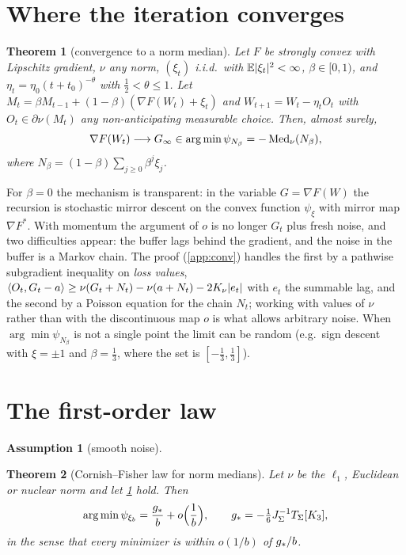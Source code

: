 \documentclass{article}
\theoremstyle{plain}
\newtheorem{theorem}{Theorem}
\theoremstyle{definition}
\newtheorem{assumption}{Assumption}
\theoremstyle{remark}
\begin{document}
\section{Where the iteration converges}\label{sec:conv}

\begin{theorem}[convergence to a norm median]\label{thm:conv}
Let $F$ be strongly convex with Lipschitz gradient, $\nu$ any norm, $(\xi_t)$ i.i.d.\ with $\mathbb{E}|\xi_t|^2<\infty$,
$\beta\in[0,1)$, and $\eta_t=\eta_0(t+t_0)^{-\theta}$ with $\frac12<\theta\le1$. Let
$M_t=\beta M_{t-1}+(1-\beta)(\nabla F(W_t)+\xi_t)$ and $W_{t+1}=W_t-\eta_tO_t$ with $O_t\in\partial\nu(M_t)$ any
non-anticipating measurable choice. Then, almost surely,
\[
\nabla F(W_t)\longrightarrow G_\infty\in\arg\min\psi_{N_\beta}=-\operatorname{Med}_\nu(N_\beta),
\]
where $N_\beta=(1-\beta)\sum_{j\ge0}\beta^j\xi_j$.
\end{theorem}

For $\beta=0$ the mechanism is transparent: in the variable $G=\nabla F(W)$ the recursion is stochastic mirror
descent on the convex function $\psi_\xi$ with mirror map $\nabla F^\ast$. With momentum the argument of $o$ is no
longer $G_t$ plus fresh noise, and two difficulties appear: the buffer lags behind the gradient, and the noise in
the buffer is a Markov chain. The proof (\cref{app:conv}) handles the first by a pathwise subgradient inequality on
\emph{loss values}, $\langle O_t, G_t-a\rangle\ge\nu(G_t+N_t)-\nu(a+N_t)-2K_\nu|e_t|$ with $e_t$ the summable lag, and the second
by a Poisson equation for the chain $N_t$; working with values of $\nu$ rather than with the discontinuous map $o$ is
what allows arbitrary noise. When $\arg\min\psi_{N_\beta}$ is not a single point the limit can be random (e.g.\ sign
descent with $\xi=\pm1$ and $\beta=\frac13$, where the set is $[-\frac13,\frac13]$).

\section{The first-order law}\label{sec:law}

\begin{assumption}[smooth noise]\label{ass:N}\StmtAssN\end{assumption}

\begin{theorem}[Cornish--Fisher law for norm medians]\label{thm:cf}
Let $\nu$ be the $\ell_1$, Euclidean or nuclear norm and let \cref{ass:N} hold. Then
\begin{equation}\label{eq:cf-main}
\arg\min\psi_{\xi_b}=\frac{g_\ast}b+o\Big(\frac1b\Big),\qquad g_\ast=-\tfrac16J_\Sigma^{-1}T_\Sigma[K_3],
\end{equation}
in the sense that every minimizer is within $o(1/b)$ of $g_\ast/b$.
\end{theorem}
\end{document}
